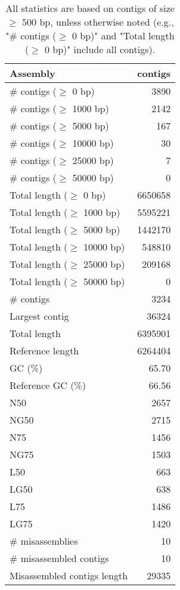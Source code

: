 \documentclass[12pt,a4paper]{article}
\begin{document}
\begin{table}[ht]
\begin{center}
\caption{All statistics are based on contigs of size $\geq$ 500 bp, unless otherwise noted (e.g., "\# contigs ($\geq$ 0 bp)" and "Total length ($\geq$ 0 bp)" include all contigs).}
\begin{tabular}{|l*{1}{|r}|}
\hline
Assembly & contigs \\ \hline
\# contigs ($\geq$ 0 bp) & 3890 \\ \hline
\# contigs ($\geq$ 1000 bp) & 2142 \\ \hline
\# contigs ($\geq$ 5000 bp) & 167 \\ \hline
\# contigs ($\geq$ 10000 bp) & 30 \\ \hline
\# contigs ($\geq$ 25000 bp) & 7 \\ \hline
\# contigs ($\geq$ 50000 bp) & 0 \\ \hline
Total length ($\geq$ 0 bp) & 6650658 \\ \hline
Total length ($\geq$ 1000 bp) & 5595221 \\ \hline
Total length ($\geq$ 5000 bp) & 1442170 \\ \hline
Total length ($\geq$ 10000 bp) & 548810 \\ \hline
Total length ($\geq$ 25000 bp) & 209168 \\ \hline
Total length ($\geq$ 50000 bp) & 0 \\ \hline
\# contigs & 3234 \\ \hline
Largest contig & 36324 \\ \hline
Total length & 6395901 \\ \hline
Reference length & 6264404 \\ \hline
GC (\%) & 65.70 \\ \hline
Reference GC (\%) & 66.56 \\ \hline
N50 & 2657 \\ \hline
NG50 & 2715 \\ \hline
N75 & 1456 \\ \hline
NG75 & 1503 \\ \hline
L50 & 663 \\ \hline
LG50 & 638 \\ \hline
L75 & 1486 \\ \hline
LG75 & 1420 \\ \hline
\# misassemblies & 10 \\ \hline
\# misassembled contigs & 10 \\ \hline
Misassembled contigs length & 29335 \\ \hline

\end{tabular}
\end{center}
\end{table}
\end{document}

